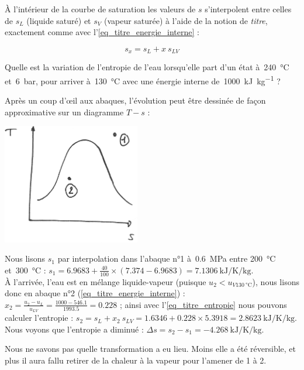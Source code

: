	
		À l’intérieur de la courbe de saturation les valeurs de $s$ s’interpolent entre celles de $s_L$ (liquide saturé) et $s_V$ (vapeur saturée) à l’aide de la notion de \emph{titre}, exactement comme avec l’\cref{eq_titre_energie_interne} :
		
		\begin{equation}
			s_x = s_L + x \ s_{LV}
			\label{eq_titre_entropie}
		\end{equation}
	
		\clearfloats
		\begin{anexample}
			Quelle est la variation de l’entropie de l’eau lorsqu’elle part d’un état à~\SI{240}{\degreeCelsius} et~\SI{6}{\bar}, pour arriver à~\SI{130}{\degreeCelsius} avec une énergie interne de~\SI{1000}{\kilo\joule\per\kilogram} ?%
			
				\begin{answer}
					Après un coup d’œil aux abaques, l’évolution peut être dessinée de façon approximative sur un diagramme $T-s$ :\\
						\begin{center}\includegraphics[width=6cm]{images/ts_example_4.png}\end{center}
					Nous lisons $s_1$ par interpolation dans l’abaque n°1 à~\SI{0,6}{\mega\pascal} entre \SI{200}{\degreeCelsius} et~\SI{300}{\degreeCelsius} : $s_1= \num{6,9683} + \frac{40}{100}\times(\num{7,374}-\num{6,9683}) = \SI{7,1306}{\kilo\joule\per\kelvin\per\kilogram} $.\\
					À l’arrivée, l’eau est en mélange liquide-vapeur (puisque $u_2<u_{V\SI{130}{\degreeCelsius}}$), nous lisons donc en abaque n°2 (\ref{eq_titre_energie_interne}) : $x_2 = \frac{u_2 - u_L}{u_{LV}} = \frac{\num{1000}-\num{546,1}}{\num{1993,5}}= \num{0,228} $ ; ainsi avec l’\cref{eq_titre_entropie} nous pouvons calculer l’entropie : $s_2= s_L + x_2 \ s_{LV} = \num{1,6346}+ \num{0,228}\times\num{5,3918} = \SI{2,8623}{\kilo\joule\per\kelvin\per\kilogram}$.\\
					Nous voyons que l’entropie a diminué : $\Delta s = s_2 - s_1 = \SI{-4,268}{\kilo\joule\per\kelvin\per\kilogram} $.
				
				\begin{remark}Nous ne savons pas quelle transformation a eu lieu. Moins elle a été réversible, et plus il aura fallu retirer de la chaleur à la vapeur pour l’amener de 1 à 2.\end{remark}\end{answer}
		\end{anexample}

